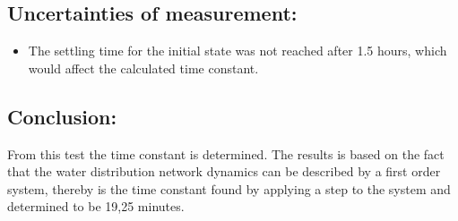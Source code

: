 
\subsection*{Uncertainties of measurement:}
\begin{itemize}
\item The settling time for the initial state was not reached after 1.5 hours, which would affect the calculated time constant.
\end{itemize}

\subsection*{Conclusion:}
From this test the time constant is determined. The results is based on the fact that the water distribution network dynamics can be described by a first order system, thereby is the time constant found by applying a step to the system and determined to be 19,25 minutes. 